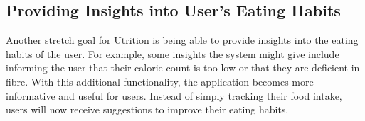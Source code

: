 \documentclass{article}
\begin{document}
\subsection{Providing Insights into User's Eating Habits}

Another stretch goal for Utrition is being able to provide insights into the eating habits of the user. For example, some insights the system might give include informing the user that their calorie count is too low or that they are deficient in fibre. With this additional functionality, the application becomes more informative and useful for users. Instead of simply tracking their food intake, users will now receive suggestions to improve their eating habits.
\end{document}
